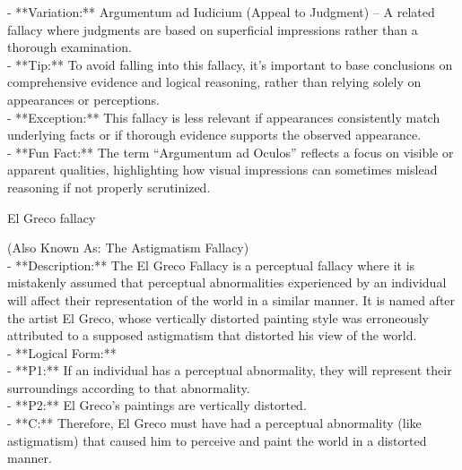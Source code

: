 \documentclass[a4paper,12pt,single,pdftex]{scrbook}
\begin{document}
{    
      - **Variation:** Argumentum ad Iudicium (Appeal to Judgment) – A related fallacy where judgments are based on superficial impressions rather than a thorough examination.
    \\

    
      - **Tip:** To avoid falling into this fallacy, it’s important to base conclusions on comprehensive evidence and logical reasoning, rather than relying solely on appearances or perceptions.
    \\

    
      - **Exception:** This fallacy is less relevant if appearances consistently match underlying facts or if thorough evidence supports the observed appearance.
    \\

    
      - **Fun Fact:** The term “Argumentum ad Oculos” reflects a focus on visible or apparent qualities, highlighting how visual impressions can sometimes mislead reasoning if not properly scrutinized.
    \\

  }


El Greco fallacy
    
      (Also Known As: The Astigmatism Fallacy)
    \\

  
    
      - **Description:** The El Greco Fallacy is a perceptual fallacy where it is mistakenly assumed that perceptual abnormalities experienced by an individual will affect their representation of the world in a similar manner. It is named after the artist El Greco, whose vertically distorted painting style was erroneously attributed to a supposed astigmatism that distorted his view of the world.
    \\

    
      - **Logical Form:**
    \\

    
        - **P1:** If an individual has a perceptual abnormality, they will represent their surroundings according to that abnormality.
    \\

    
        - **P2:** El Greco's paintings are vertically distorted.
    \\

    
        - **C:** Therefore, El Greco must have had a perceptual abnormality (like astigmatism) that caused him to perceive and paint the world in a distorted manner.
    \\
\end{document}
